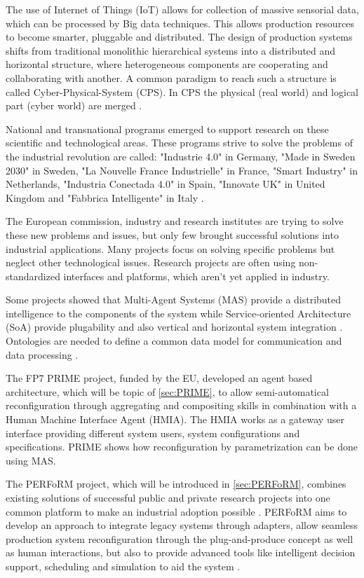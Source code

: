 \documentclass[conference,compsoc,hidelinks]{IEEEtran}
\begin{document}
The use of Internet of Things (IoT) allows for collection of massive sensorial data, which can be processed by Big data techniques. This allows production resources to become smarter, pluggable and distributed. The design of production systems shifts from traditional monolithic hierarchical systems into a distributed and horizontal structure, where heterogeneous components are cooperating and collaborating with another. A common paradigm to reach such a structure is called Cyber-Physical-System (CPS). In CPS the physical (real world) and logical part (cyber world) are merged \cite{SpecPERFoRM}.

National and transnational programs emerged to support research on these scientific and technological areas. These programs strive to solve the problems of the industrial revolution are called: "Industrie 4.0" in Germany, "Made in Sweden 2030" in Sweden, "La Nouvelle France Industrielle" in France, "Smart Industry" in Netherlands, "Industria Conectada 4.0" in Spain, "Innovate UK" in United Kingdom and "Fabbrica Intelligente" in Italy \cite{SpecPERFoRM}. 

The European commission, industry and research institutes are trying to solve these new problems and issues, but only few brought successful solutions into industrial applications. Many projects focus on solving specific problems but neglect other technological issues. Research projects are often using non-standardized interfaces and platforms, which aren't yet applied in industry. 

Some projects showed that Multi-Agent Systems (MAS) provide a distributed intelligence to the components of the system while Service-oriented Architecture (SoA) provide plugability and also vertical and horizontal system integration \cite{Colombo2009}. Ontologies are needed to define a common data model for communication and data processing \cite{Peres2017}.

The FP7 PRIME project, funded by the EU, developed an agent based architecture, which will be topic of \autoref{sec:PRIME}, to allow semi-automatical reconfiguration through aggregating and compositing skills in combination with a Human Machine Interface Agent (HMIA). The HMIA works as a gateway user interface providing different system users, system configurations and specifications. PRIME shows how reconfiguration by parametrization can be done using MAS.

The PERFoRM project, which will be introduced in \autoref{sec:PERFoRM}, combines existing solutions of successful public and private research projects into one common platform to make an industrial adoption possible \cite{HarmonizedSystems}. PERFoRM aims to develop an approach to integrate legacy systems through adapters, allow seamless production system reconfiguration through the plug-and-produce concept as well as human interactions, but also to provide advanced tools like intelligent decision support, scheduling and simulation to aid the system \cite{SpecPERFoRM}.
\end{document}
